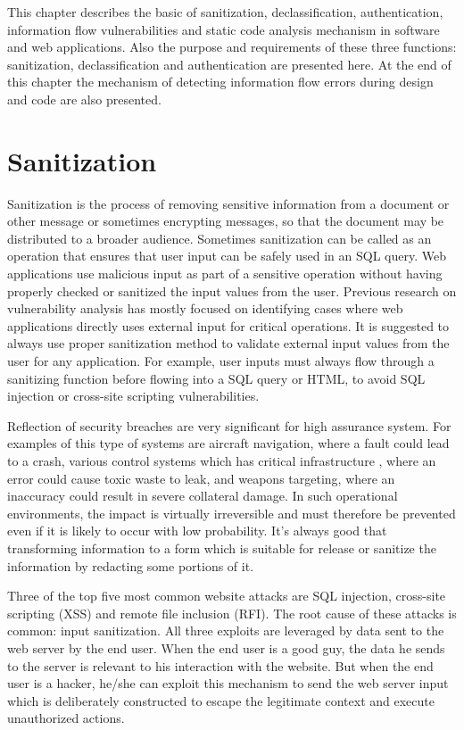 This chapter describes the basic of sanitization, declassification, authentication, information flow vulnerabilities and static code analysis mechanism in software and web applications. Also the purpose and requirements of these three functions: sanitization, declassification and authentication are presented here. At the end of this chapter the mechanism of detecting information flow errors during design and code are also presented.

\section{Sanitization}
Sanitization is the process of removing sensitive information from a document or other message or sometimes encrypting messages, so that the document may be distributed to a broader audience. Sometimes sanitization can be called as an operation that ensures that user input can be safely used in an SQL query. Web applications use malicious input as part of a sensitive operation without having properly checked or sanitized the input values from the user. Previous research on vulnerability analysis has mostly focused on identifying cases where web applications directly uses external input for critical operations. It is suggested to always use proper sanitization method to validate external input values from the user for any application. For example, user inputs must always flow through a sanitizing function before flowing into a SQL query or HTML, to avoid SQL injection or cross-site scripting vulnerabilities.

Reflection of security breaches are very significant for high assurance system. For examples of this type of systems are aircraft navigation, where a fault could lead to a crash, various control systems which has critical infrastructure , where an error 
could cause toxic waste to leak, and weapons targeting, where an inaccuracy could result in severe collateral damage. In such
operational environments, the impact is virtually irreversible and must therefore be prevented even if it is likely to occur
with low probability. It's always good that transforming information to a form which is suitable for release or sanitize the information by redacting some portions of it.

Three of the top five most common website attacks are SQL injection, cross-site scripting (XSS) and remote file inclusion (RFI). The root cause of these attacks is common: input sanitization. All three exploits are leveraged by data sent to the web server by the end user. When the end user is a good guy, the data he sends to the server is relevant to his interaction with the website. But when the end user is a hacker, he/she can exploit this mechanism to send the web server input which is deliberately constructed to escape the legitimate context and execute unauthorized actions.

